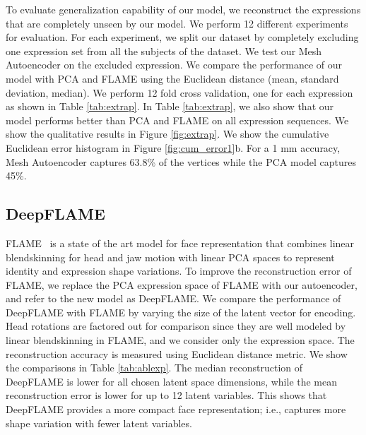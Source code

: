 To evaluate generalization capability of our model, we reconstruct the expressions that are completely unseen by our model. We perform 12 different experiments for evaluation. For each experiment, we split our dataset by completely excluding one expression set from all the subjects of the dataset. We test our Mesh Autoencoder on the excluded expression. We compare the performance of our model with PCA and FLAME using the Euclidean distance (mean, standard deviation, median). We perform 12 fold cross validation, one for each expression as shown in Table \ref{tab:extrap}.
In Table \ref{tab:extrap}, we also show that our model performs better than PCA and FLAME \cite{FLAME2017} on all expression sequences. We show the qualitative results in Figure \ref{fig:extrap}.
We show the cumulative Euclidean error histogram in Figure \ref{fig:cum_error1}b. For a 1 mm accuracy, Mesh Autoencoder captures 63.8\% of the vertices while the PCA model captures 45\%.


\subsection{DeepFLAME}
\label{sec:deep_FLAME}
FLAME~\cite{FLAME2017} is a state of the art model for face representation that combines linear blendskinning for head and jaw motion with linear PCA spaces to represent identity and expression shape variations. To improve the reconstruction error of FLAME, we replace the PCA expression space of FLAME with our autoencoder, and refer to the new model as DeepFLAME. We compare the performance of DeepFLAME with FLAME by varying the size of the latent vector for encoding. Head rotations are factored out for comparison since they are well modeled by linear blendskinning in FLAME, and we consider only the expression space. The reconstruction accuracy is measured using Euclidean distance metric. We show the comparisons in Table \ref{tab:ablexp}. The median reconstruction of DeepFLAME is lower for all chosen latent space dimensions, while the mean reconstruction error is lower for up to 12 latent variables. This shows that DeepFLAME provides a more compact face representation; i.e., captures more shape variation with fewer latent variables.



